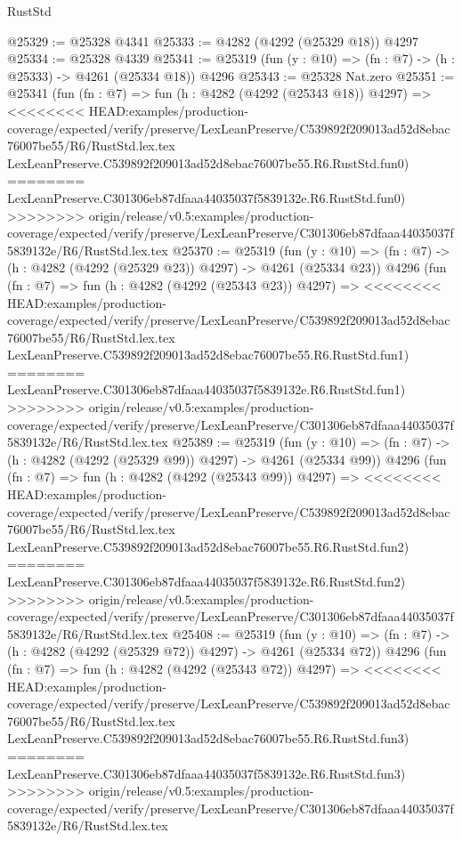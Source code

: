 \begin{lexlean}{RustStd}
\begin{coremodule}
{\begin{coremodule}
{{{{{{{{{{{{{{{{{{{{{{{{{{{{{{{{{{{@25329 := @25328 @4341
@25333 := @4282 (@4292 (@25329 @18)) @4297
@25334 := @25328 @4339
@25341 := @25319 (fun (y : @10) => (fn : @7) -> (h : @25333) -> @4261 (@25334 @18)) @4296
@25343 := @25328 Nat.zero
@25351 := @25341
    (fun (fn : @7) =>
    fun (h : @4282 (@4292 (@25343 @18)) @4297) =>
<<<<<<<< HEAD:examples/production-coverage/expected/verify/preserve/LexLeanPreserve/C539892f209013ad52d8ebac76007be55/R6/RustStd.lex.tex
    LexLeanPreserve.C539892f209013ad52d8ebac76007be55.R6.RustStd.fun0)
========
    LexLeanPreserve.C301306eb87dfaaa44035037f5839132e.R6.RustStd.fun0)
>>>>>>>> origin/release/v0.5:examples/production-coverage/expected/verify/preserve/LexLeanPreserve/C301306eb87dfaaa44035037f5839132e/R6/RustStd.lex.tex
@25370 := @25319
    (fun (y : @10) => (fn : @7) -> (h : @4282 (@4292 (@25329 @23)) @4297) -> @4261 (@25334 @23))
    @4296
    (fun (fn : @7) =>
    fun (h : @4282 (@4292 (@25343 @23)) @4297) =>
<<<<<<<< HEAD:examples/production-coverage/expected/verify/preserve/LexLeanPreserve/C539892f209013ad52d8ebac76007be55/R6/RustStd.lex.tex
    LexLeanPreserve.C539892f209013ad52d8ebac76007be55.R6.RustStd.fun1)
========
    LexLeanPreserve.C301306eb87dfaaa44035037f5839132e.R6.RustStd.fun1)
>>>>>>>> origin/release/v0.5:examples/production-coverage/expected/verify/preserve/LexLeanPreserve/C301306eb87dfaaa44035037f5839132e/R6/RustStd.lex.tex
@25389 := @25319
    (fun (y : @10) => (fn : @7) -> (h : @4282 (@4292 (@25329 @99)) @4297) -> @4261 (@25334 @99))
    @4296
    (fun (fn : @7) =>
    fun (h : @4282 (@4292 (@25343 @99)) @4297) =>
<<<<<<<< HEAD:examples/production-coverage/expected/verify/preserve/LexLeanPreserve/C539892f209013ad52d8ebac76007be55/R6/RustStd.lex.tex
    LexLeanPreserve.C539892f209013ad52d8ebac76007be55.R6.RustStd.fun2)
========
    LexLeanPreserve.C301306eb87dfaaa44035037f5839132e.R6.RustStd.fun2)
>>>>>>>> origin/release/v0.5:examples/production-coverage/expected/verify/preserve/LexLeanPreserve/C301306eb87dfaaa44035037f5839132e/R6/RustStd.lex.tex
@25408 := @25319
    (fun (y : @10) => (fn : @7) -> (h : @4282 (@4292 (@25329 @72)) @4297) -> @4261 (@25334 @72))
    @4296
    (fun (fn : @7) =>
    fun (h : @4282 (@4292 (@25343 @72)) @4297) =>
<<<<<<<< HEAD:examples/production-coverage/expected/verify/preserve/LexLeanPreserve/C539892f209013ad52d8ebac76007be55/R6/RustStd.lex.tex
    LexLeanPreserve.C539892f209013ad52d8ebac76007be55.R6.RustStd.fun3)
========
    LexLeanPreserve.C301306eb87dfaaa44035037f5839132e.R6.RustStd.fun3)
>>>>>>>> origin/release/v0.5:examples/production-coverage/expected/verify/preserve/LexLeanPreserve/C301306eb87dfaaa44035037f5839132e/R6/RustStd.lex.tex
}}}}}}}}}}}}}}}}}}}}}}}}}}}}}}}}}}}
\end{coremodule}}
\end{coremodule}
\end{lexlean}
